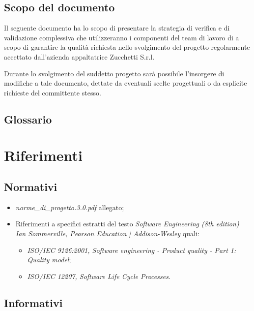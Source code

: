\subsection{Scopo del documento}

Il seguente documento ha lo scopo di presentare la strategia di verifica e di validazione complessiva che utilizzeranno i componenti del team di lavoro di \team{} a scopo di garantire la qualità richiesta nello svolgimento del progetto \caName{} regolarmente accettato dall'azienda appaltatrice Zucchetti S.r.l.

Durante lo svolgimento del suddetto progetto sarà possibile l'insorgere di modifiche a tale documento, dettate da eventuali scelte progettuali o da esplicite richieste del committente stesso.

\subsection{Glossario}
\glossaryIntro
\clearpage

\section{Riferimenti}

\subsection{Normativi}

\begin{itemize}
\item[] \textit{norme\_di\_progetto.3.0.pdf} allegato;
\item[]  Riferimenti a specifici estratti del testo \textit{Software Engineering (8th edition) Ian Sommerville, Pearson Education | Addison-Wesley} quali:
\begin{itemize}
\item[]  \textit{ISO/IEC 9126:2001, Software engineering - Product quality - Part 1: Quality model};
\item[]  \textit{ISO/IEC 12207, Software Life Cycle Processes}.
\end{itemize}
\end{itemize}

\subsection{Informativi}

